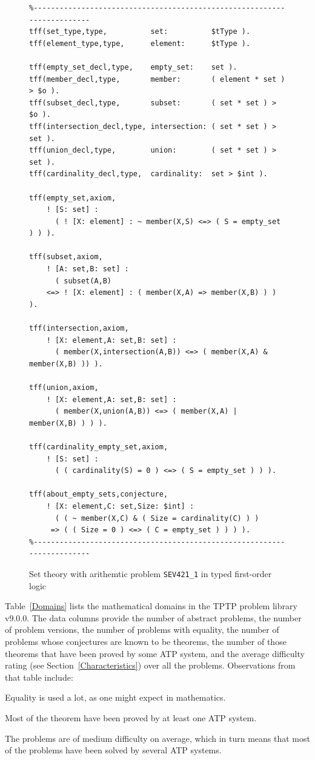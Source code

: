 \documentclass[runningheads]{llncs}
\newenvironment{packed_itemize}{
\vspace*{-0.2em}
\begin{itemize}
\setlength{\partopsep}{0pt}
\setlength{\itemsep}{1pt}
\setlength{\parskip}{0pt}
\setlength{\parsep}{0pt}
}{\end{itemize}}
\begin{document}
\begin{figure}[htb]
\centering
{\footnotesize
{\setlength{\baselineskip}{3mm}
\begin{verbatim}
%------------------------------------------------------------------------
tff(set_type,type,          set:          $tType ).
tff(element_type,type,      element:      $tType ).

tff(empty_set_decl,type,    empty_set:    set ).
tff(member_decl,type,       member:       ( element * set ) > $o ).
tff(subset_decl,type,       subset:       ( set * set ) > $o ).
tff(intersection_decl,type, intersection: ( set * set ) > set ).
tff(union_decl,type,        union:        ( set * set ) > set ).
tff(cardinality_decl,type,  cardinality:  set > $int ).

tff(empty_set,axiom,
    ! [S: set] :
      ( ! [X: element] : ~ member(X,S) <=> ( S = empty_set ) ) ).

tff(subset,axiom,
    ! [A: set,B: set] :
      ( subset(A,B)
    <=> ! [X: element] : ( member(X,A) => member(X,B) ) ) ).

tff(intersection,axiom,
    ! [X: element,A: set,B: set] :
      ( member(X,intersection(A,B)) <=> ( member(X,A) & member(X,B) )) ).

tff(union,axiom,
    ! [X: element,A: set,B: set] :
      ( member(X,union(A,B)) <=> ( member(X,A) | member(X,B) ) ) ).

tff(cardinality_empty_set,axiom,
    ! [S: set] :
      ( ( cardinality(S) = 0 ) <=> ( S = empty_set ) ) ).

tff(about_empty_sets,conjecture,
    ! [X: element,C: set,Size: $int] :
      ( ( ~ member(X,C) & ( Size = cardinality(C) ) )
     => ( ( Size = 0 ) <=> ( C = empty_set ) ) ) ).
%------------------------------------------------------------------------
\end{verbatim}
}}
\caption{Set theory with arithemtic problem {\tt SEV421\_1} in typed first-order logic}
\label{ExampleTF0}
\end{figure}

Table~\ref{Domains} lists the mathematical domains in the TPTP problem library v9.0.0.
The data columns provide the number of abstract problems, the number of problem versions, the
number of problems with equality, the number of problems whose conjectures are known to be
theorems, the number of those theorems that have been proved by some ATP system, and the average 
difficulty rating (see Section~\ref{Characteristics}) over all the problems.
Observations from that table include:
\begin{packed_itemize}
\item Equality is used a lot, as one might expect in mathematics.
\item Most of the theorem have been proved by at least one ATP system.
\item The problems are of medium difficulty on average, which in turn means that most of the 
      problems have been solved by several ATP systems.
\end{packed_itemize}
\end{document}
